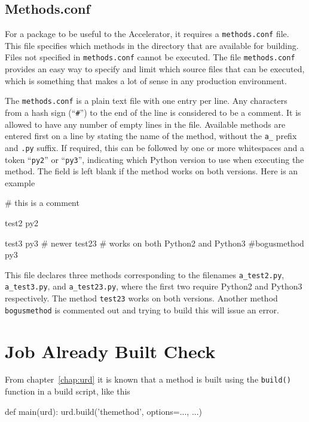 \subsection{Methods.conf}
\label{sec:methods_conf}
For a package to be useful to the Accelerator, it requires
a \texttt{methods.conf} file.  This file specifies which methods in
the directory that are available for building.  Files not specified
in \texttt{methods.conf} cannot be executed.  The
file \texttt{methods.conf} provides an easy way to specify and limit
which source files that can be executed, which is something that makes
a lot of sense in any production environment.

The \texttt{methods.conf} is a plain text file with one entry per
line.  Any characters from a hash sign (``\texttt{\#}'') to the end of
the line is considered to be a comment.  It is allowed to have any
number of empty lines in the file.  Available methods are entered
first on a line by stating the name of the method, without the
\texttt{a\_} prefix and \texttt{.py} suffix.  If required, this can be
followed by one or more whitespaces and a token ``\texttt{py2}'' or
``\texttt{py3}'', indicating which Python version to use when
executing the method.  The field is left blank if the method works on
both versions.  Here is an example
\begin{shell}
# this is a comment

test2           py2

test3           py3  # newer
test23               # works on both Python2 and Python3
#bogusmethod    py3
\end{shell}
This file declares three methods corresponding to the filenames
\texttt{a\_test2.py}, \texttt{a\_test3.py}, and \texttt{a\_test23.py},
where the first two require Python2 and Python3 respectively.  The
method \texttt{test23} works on both versions.  Another method
\texttt{bogusmethod} is commented out and trying to build this will
issue an error.





\section{Job Already Built Check}

From chapter~\ref{chap:urd} it is known that a method is built using
the \texttt{build()} function in a build script, like this
\begin{python}
def main(urd):
    urd.build('themethod', options=..., ...)
\end{python}

